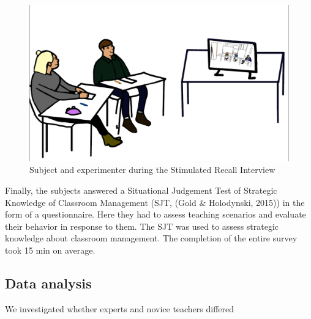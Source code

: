 \documentclass[
  man]{apa6}
\begin{document}
\begin{figure}

{\centering \includegraphics{./pictures/sri} 

}

\caption{Subject and experimenter during the Stimulated Recall Interview}\label{fig:sri}
\end{figure}

Finally, the subjects answered a Situational Judgement Test of Strategic Knowledge of Classroom Management (SJT, (Gold \& Holodynski, 2015)) in the form of a questionnaire. Here they had to assess teaching scenarios and evaluate their behavior in response to them. The SJT was used to assess strategic knowledge about classroom management. The completion of the entire survey took 15 min on average.

\hypertarget{data-analysis}{%
\subsection{Data analysis}\label{data-analysis}}

We investigated whether experts and novice teachers differed
\end{document}
